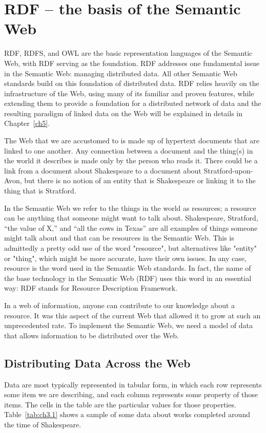 \chapter{RDF -- the basis of the Semantic Web}
\label{ch3}
RDF, RDFS, and OWL are the basic representation languages of the
Semantic Web, with RDF serving as the foundation. RDF addresses one
fundamental issue in the Semantic Web: managing distributed data. All
other Semantic Web standards build on this foundation of distributed
data. RDF relies heavily on the infrastructure of the Web, using many of
its familiar and proven features, while extending them to provide a
foundation for a distributed network of data and the resulting paradigm
of linked data on the Web will be explained in details in Chapter~\ref{ch5}.



The Web that we are accustomed to is made up of hypertext documents that are
linked to one another. Any connection between a document and the
thing(s) in the world it describes is made only by the person who reads
it. There could be a link from a document about Shakespeare to
a document about Stratford-upon-Avon, but there is no notion of an
entity that is Shakespeare or linking it to the thing that is Stratford.

In the Semantic Web we refer to the things in the world as resources; a
resource can be anything that someone might want to talk about. Shakespeare, Stratford, ``the
value of X,'' and ``all the cows in Texas'' are all examples of things
someone might talk about and that can be resources in the Semantic Web.
This is admittedly a pretty odd use of the word "resource", but
alternatives like "entity" or "thing", which might be more accurate, have
their own issues. In any case, resource is the word used in the
Semantic Web standards. In fact, the name of the base technology in the
Semantic Web (RDF) uses this word in an essential way: RDF stands for
Resource Description Framework.

In a web of information, anyone can contribute to our knowledge about a
resource. It was this aspect of the current Web that allowed it to grow
at such an unprecedented rate. To implement the Semantic Web, we need a
model of data that allows information to be distributed over the Web.

\section{Distributing Data Across the Web}
\label{distribute}
Data are most typically represented in tabular form, in which each row
represents some item we are describing, and each column represents some
property of those items. The cells in the table are the particular
values for those properties. Table~\ref{tab:ch3.1} shows a sample of some data about
works completed around the time of Shakespeare.

